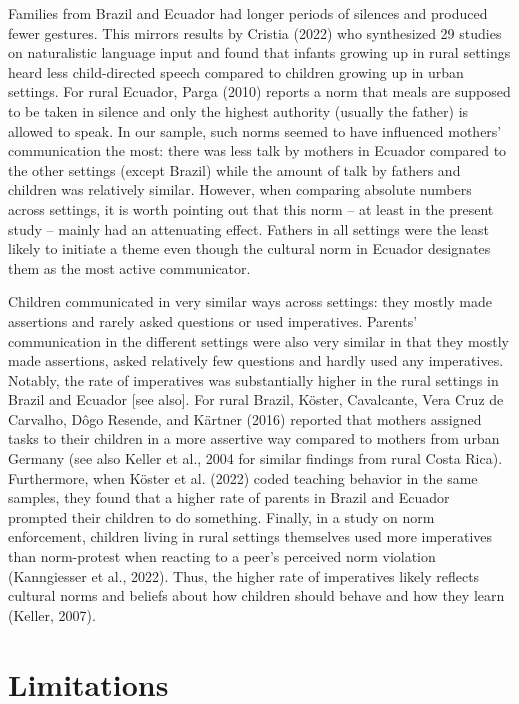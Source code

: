\documentclass[
  man,floatsintext]{apa6}
\begin{document}
Families from Brazil and Ecuador had longer periods of silences and produced fewer gestures. This mirrors results by Cristia (2022) who synthesized 29 studies on naturalistic language input and found that infants growing up in rural settings heard less child-directed speech compared to children growing up in urban settings. For rural Ecuador, Parga (2010) reports a norm that meals are supposed to be taken in silence and only the highest authority (usually the father) is allowed to speak. In our sample, such norms seemed to have influenced mothers' communication the most: there was less talk by mothers in Ecuador compared to the other settings (except Brazil) while the amount of talk by fathers and children was relatively similar. However, when comparing absolute numbers across settings, it is worth pointing out that this norm -- at least in the present study -- mainly had an attenuating effect. Fathers in all settings were the least likely to initiate a theme even though the cultural norm in Ecuador designates them as the most active communicator.

Children communicated in very similar ways across settings: they mostly made assertions and rarely asked questions or used imperatives. Parents' communication in the different settings were also very similar in that they mostly made assertions, asked relatively few questions and hardly used any imperatives. Notably, the rate of imperatives was substantially higher in the rural settings in Brazil and Ecuador {[}see also{]}. For rural Brazil, Köster, Cavalcante, Vera Cruz de Carvalho, Dôgo Resende, and Kärtner (2016) reported that mothers assigned tasks to their children in a more assertive way compared to mothers from urban Germany (see also Keller et al., 2004 for similar findings from rural Costa Rica). Furthermore, when Köster et al. (2022) coded teaching behavior in the same samples, they found that a higher rate of parents in Brazil and Ecuador prompted their children to do something. Finally, in a study on norm enforcement, children living in rural settings themselves used more imperatives than norm-protest when reacting to a peer's perceived norm violation (Kanngiesser et al., 2022). Thus, the higher rate of imperatives likely reflects cultural norms and beliefs about how children should behave and how they learn (Keller, 2007).

\hypertarget{limitations}{%
\section{Limitations}\label{limitations}}
\end{document}
